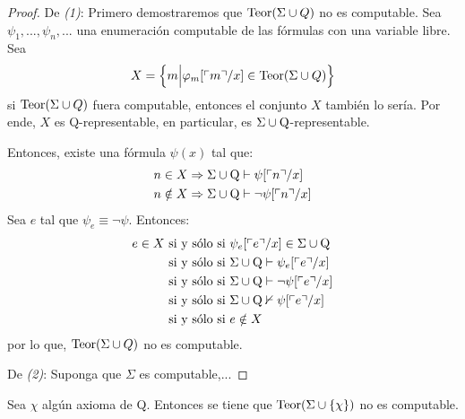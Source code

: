 \documentclass[12pt]{report}
\newcounter{it}
\theoremstyle{largebreak}
\begin{document}
    \begin{proof}
        De \textit{(1)}: Primero demostraremos que $\textup{Teor}(\Sigma\cup Q)$ no es computable. Sea $\psi_1,...,\psi_n,...$ una enumeración computable de las fórmulas con una variable libre. Sea
        \begin{equation*}
            X=\left\{m\Big|\varphi_m[\ulcorner m\urcorner/x]\in\textup{Teor}(\Sigma\cup Q) \right\}
        \end{equation*}
        si $\textup{Teor}(\Sigma\cup Q)$ fuera computable, entonces el conjunto $X$ también lo sería. Por ende, $X$ es Q-representable, en particular, es $\Sigma\cup\textup{Q}$-representable.

        Entonces, existe una fórmula $\psi(x)$ tal que:
        \begin{equation*}
            \begin{split}
                n\in X&\Rightarrow \Sigma\cup\textup{Q}\vdash\psi[\ulcorner n\urcorner/x]\\
                n\notin X&\Rightarrow \Sigma\cup\textup{Q}\vdash\neg\psi[\ulcorner n\urcorner/x]\\
            \end{split}
        \end{equation*}
        Sea $e$ tal que $\psi_e\equiv\neg\psi$. Entonces:
        \begin{equation*}
            \begin{split}
                e\in X&\textup{ si y sólo si }\psi_e[\ulcorner e\urcorner/x]\in\Sigma\cup\textup{Q}\\
                &\textup{ si y sólo si }\Sigma\cup\textup{Q}\vdash \psi_e[\ulcorner e\urcorner/x]\\
                &\textup{ si y sólo si }\Sigma\cup\textup{Q}\vdash\neg\psi[\ulcorner e\urcorner/x]\\
                &\textup{ si y sólo si }\Sigma\cup\textup{Q}\nvdash\psi[\ulcorner e\urcorner/x]\\
                &\textup{ si y sólo si }e\notin X\\
            \end{split}
        \end{equation*}
        por lo que, $\textup{Teor}(\Sigma\cup Q)$ no es computable.

        De \textit{(2)}: Suponga que $\Sigma$ es computable,...
    \end{proof}

    Sea $\chi$ algún axioma de Q. Entonces se tiene que $\textup{Teor}(\Sigma\cup\left\{\chi\right\})$ no es computable.
\end{document}

